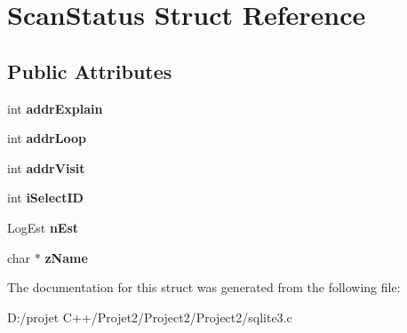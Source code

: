 \hypertarget{struct_scan_status}{}\section{Scan\+Status Struct Reference}
\label{struct_scan_status}
\subsection*{Public Attributes}
\begin{DoxyCompactItemize}
\item 
\mbox{\label{struct_scan_status_a621d9ae1f07b7730f1e5e2a5a0473a2e}} 
int {\bfseries addr\+Explain}
\item 
\mbox{\label{struct_scan_status_a9a6acff15920d8de4b97a3d3fd6781d9}} 
int {\bfseries addr\+Loop}
\item 
\mbox{\label{struct_scan_status_a31523fd6dd0dfca1233b51606140b740}} 
int {\bfseries addr\+Visit}
\item 
\mbox{\label{struct_scan_status_a04e5536574db523ebfcdbecdfa39568a}} 
int {\bfseries i\+Select\+ID}
\item 
\mbox{\label{struct_scan_status_af8666388f46040047c5e4bc9097d0336}} 
Log\+Est {\bfseries n\+Est}
\item 
\mbox{\label{struct_scan_status_ae88705a0b24b1bde60c87cdbde902c24}} 
char $\ast$ {\bfseries z\+Name}
\end{DoxyCompactItemize}


The documentation for this struct was generated from the following file\+:\begin{DoxyCompactItemize}
\item 
D\+:/projet C++/\+Projet2/\+Project2/\+Project2/sqlite3.\+c\end{DoxyCompactItemize}
